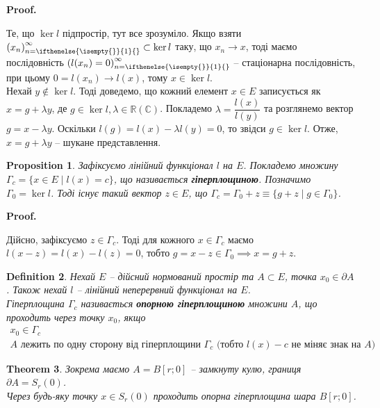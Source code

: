 \documentclass[a4paper, 10pt]{article}
\makeatletter
\theoremstyle{theoremdd}
\newtheorem{theorem}{Theorem}[subsection]
\theoremstyle{theoremdd}
\newtheorem{definition}[theorem]{Definition}
\theoremstyle{theoremdd}
\theoremstyle{theoremdd}
\theoremstyle{theoremdd}
\newtheorem{proposition}[theorem]{Proposition}
\theoremstyle{theoremdd}
\theoremstyle{theoremdd}
\theoremstyle{theoremdd}
\newcommand{\sequence}[2][]{\left({#2}\right)_{n=\ifthenelse{\isempty{#1}}{1}{#1}}^{\infty}}
\renewenvironment{proof}[1][Proof.\\]{\par
\pushQED{\hfill \qed}%
\normalfont \topsep6\p@\@plus6\p@\relax
\trivlist
\item\relax
{\bfseries
#1\@addpunct{.}}\hspace\labelsep\ignorespaces
}{%
\popQED\endtrivlist\@endpefalse
}
\makeatother
\begin{document}
\begin{proof}
Те, що $\ker l$ підпростір, тут все зрозуміло. Якщо взяти $\sequence{x_n} \subset \ker l$ таку, що $x_n \to x$, тоді маємо послідовність $\sequence{l(x_n) = 0}$ -- стаціонарна послідовність, при цьому $0 =l(x_n) \to l(x)$, тому $x \in \ker l$.\\
Нехай $y \notin \ker l$. Тоді доведемо, що кожний елемент $x \in E$ записується як $x = g + \lambda y$, де $g \in \ker l, \lambda \in \mathbb{R} (\mathbb{C})$. Покладемо $\lambda = \dfrac{l(x)}{l(y)}$ та розглянемо вектор $g = x - \lambda y$. Оскільки $l(g) = l(x) - \lambda l(y) = 0$, то звідси $g \in \ker l$. Отже, $x = g + \lambda y$ -- шукане представлення.
\end{proof}

\iffalse %
\begin{proposition}
Зафіксуємо лінійний функціонал $l$ на $E$. Покладемо множину $\Gamma_c = \{x \in E \mid l(x) = c\}$, що називається \textbf{гіперплощиною}. Позначимо $\Gamma_0 = \ker l$. Тоді існує такий вектор $z \in E$, що $\Gamma_c = \Gamma_0 + z \equiv \{g + z \mid g \in \Gamma_0 \}$.
\end{proposition}

\begin{proof}
Дійсно, зафіксуємо $z \in \Gamma_c$. Тоді для кожного $x \in \Gamma_c$ маємо $l(x-z) = l(x) - l(z) = 0$, тобто $g = x-z \in \Gamma_0 \implies x = g +z$.
\end{proof}

\begin{definition}
Нехай $E$ -- дійсний нормований простір та $A \subset E$, точка $x_0 \in \partial A$. Також нехай $l$ -- лінійний неперервний функціонал на $E$.\\
Гіперплощина $\Gamma_c$ називається \textbf{опорною гіперплощиною} множини $A$, що проходить через точку $x_0$, якщо
\begin{align*}
x_0 \in \Gamma_c \\
A \text{ лежить по одну сторону від гіперплощини } \Gamma_c \text{ (тобто $l(x) - c$ не міняє знак на $A$)}
\end{align*}
\end{definition}

\begin{theorem}
Зокрема маємо $A = B[r;0]$ -- замкнуту кулю, границя $\partial A = S_r(0)$.\\
Через будь-яку точку $x \in S_r(0)$ проходить опорна гіперплощина шара $B[r;0]$.
\end{theorem}
\end{document}
